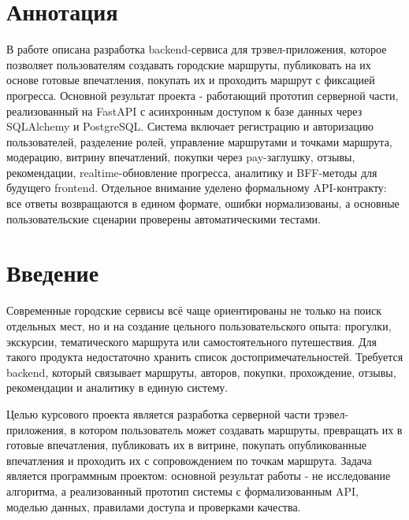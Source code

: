 \documentclass[a4paper,12pt]{extarticle}
\begin{document}

\newpage
\setcounter{page}{2}

{
	\hypersetup{linkcolor=black}
	\tableofcontents
}

\newpage

\section*{Аннотация}
В работе описана разработка backend-сервиса для трэвел-приложения, которое позволяет пользователям создавать городские маршруты, публиковать на их основе готовые впечатления, покупать их и проходить маршрут с фиксацией прогресса. Основной результат проекта - работающий прототип серверной части, реализованный на FastAPI с асинхронным доступом к базе данных через SQLAlchemy и PostgreSQL. Система включает регистрацию и авторизацию пользователей, разделение ролей, управление маршрутами и точками маршрута, модерацию, витрину впечатлений, покупки через pay-заглушку, отзывы, рекомендации, realtime-обновление прогресса, аналитику и BFF-методы для будущего frontend. Отдельное внимание уделено формальному API-контракту: все ответы возвращаются в едином формате, ошибки нормализованы, а основные пользовательские сценарии проверены автоматическими тестами.



\section{Введение}

Современные городские сервисы всё чаще ориентированы не только на поиск отдельных мест, но и на создание цельного пользовательского опыта: прогулки, экскурсии, тематического маршрута или самостоятельного путешествия. Для такого продукта недостаточно хранить список достопримечательностей. Требуется backend, который связывает маршруты, авторов, покупки, прохождение, отзывы, рекомендации и аналитику в единую систему.

Целью курсового проекта является разработка серверной части трэвел-приложения, в котором пользователь может создавать маршруты, превращать их в готовые впечатления, публиковать их в витрине, покупать опубликованные впечатления и проходить их с сопровождением по точкам маршрута. Задача является программным проектом: основной результат работы - не исследование алгоритма, а реализованный прототип системы с формализованным API, моделью данных, правилами доступа и проверками качества.
\end{document}

